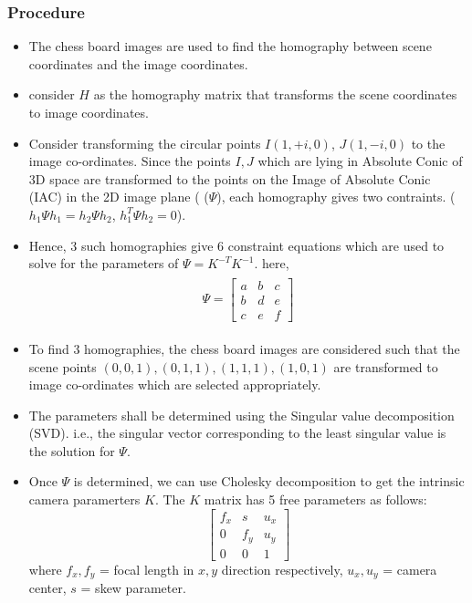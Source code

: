\documentclass[fleqn]{article}
\begin{document}
\subsubsection{Procedure}
\begin{itemize}
\item The chess board images are used to find the homography between scene coordinates and the image coordinates.
\item consider $H$ as the homography matrix that transforms the scene coordinates to image coordinates. 
\item Consider transforming the circular points $I(1, +i, 0)$, $J(1, -i, 0)$ to the image co-ordinates. Since the points $I, J$
which are lying in Absolute Conic of 3D space are transformed to the points on the Image of Absolute Conic (IAC) in the 2D image plane (
($\Psi$), each homography gives two contraints. ($h_1 \Psi h_1 = h_2 \Psi h_2$, $h_1^T \Psi h_2 = 0$).
\item Hence, 3 such homographies give 6 constraint equations which are used to solve for the parameters of $\Psi = K^{-T}K^{-1}$.
  here, 
  \begin{eqnarray*}
  \begin{aligned}
  \Psi = \begin{bmatrix}
   		a & b & c \\
   		b & d & e \\
   		c & e & f
   \end{bmatrix}
  \end{aligned}
  \end{eqnarray*}
  \item To find 3 homographies, the chess board images are considered such that the scene points $(0, 0, 1),(0, 1, 1),(1, 1, 1),(1, 0, 1)$ are
  transformed to image co-ordinates which are selected appropriately.
  \item The parameters shall be determined using the Singular value decomposition (SVD). i.e., the singular vector corresponding to the least singular
  value is the solution for $\Psi$.
  \item Once $\Psi$ is determined, we can use Cholesky decomposition to get the intrinsic camera paramerters $K$. 
  The $K$ matrix has 5 free parameters as follows:
  \[
   \begin{bmatrix}
   		f_x & s & u_x \\
   		0 & f_y & u_y \\
   		0 & 0 & 1
   \end{bmatrix}
  \]
  where  $f_x, f_y $ = focal length in $x, y$ direction respectively, $u_x, u_y$ = camera center, $s$ = skew parameter.



\end{itemize}
\end{document}
